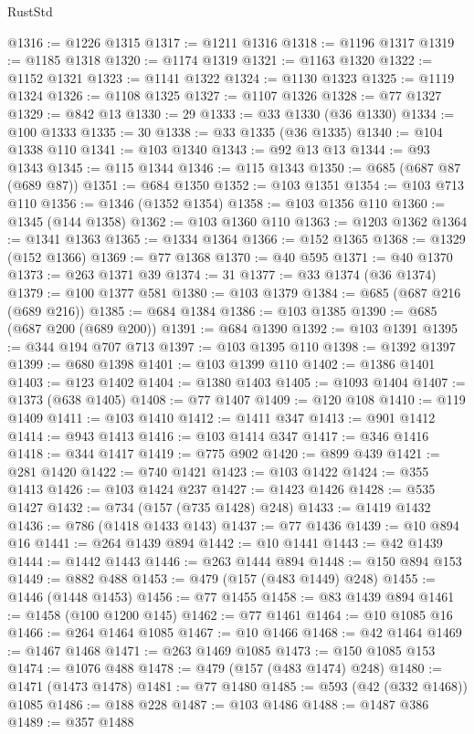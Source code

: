 \begin{lexlean}{RustStd}
\begin{coremodule}
@1316 := @1226 @1315
@1317 := @1211 @1316
@1318 := @1196 @1317
@1319 := @1185 @1318
@1320 := @1174 @1319
@1321 := @1163 @1320
@1322 := @1152 @1321
@1323 := @1141 @1322
@1324 := @1130 @1323
@1325 := @1119 @1324
@1326 := @1108 @1325
@1327 := @1107 @1326
@1328 := @77 @1327
@1329 := @842 @13
@1330 := 29
@1333 := @33 @1330 (@36 @1330)
@1334 := @100 @1333
@1335 := 30
@1338 := @33 @1335 (@36 @1335)
@1340 := @104 @1338 @110
@1341 := @103 @1340
@1343 := @92 @13 @13
@1344 := @93 @1343
@1345 := @115 @1344
@1346 := @115 @1343
@1350 := @685 (@687 @87 (@689 @87))
@1351 := @684 @1350
@1352 := @103 @1351
@1354 := @103 @713 @110
@1356 := @1346 (@1352 @1354)
@1358 := @103 @1356 @110
@1360 := @1345 (@144 @1358)
@1362 := @103 @1360 @110
@1363 := @1203 @1362
@1364 := @1341 @1363
@1365 := @1334 @1364
@1366 := @152 @1365
@1368 := @1329 (@152 @1366)
@1369 := @77 @1368
@1370 := @40 @595
@1371 := @40 @1370
@1373 := @263 @1371 @39
@1374 := 31
@1377 := @33 @1374 (@36 @1374)
@1379 := @100 @1377 @581
@1380 := @103 @1379
@1384 := @685 (@687 @216 (@689 @216))
@1385 := @684 @1384
@1386 := @103 @1385
@1390 := @685 (@687 @200 (@689 @200))
@1391 := @684 @1390
@1392 := @103 @1391
@1395 := @344 @194 @707 @713
@1397 := @103 @1395 @110
@1398 := @1392 @1397
@1399 := @680 @1398
@1401 := @103 @1399 @110
@1402 := @1386 @1401
@1403 := @123 @1402
@1404 := @1380 @1403
@1405 := @1093 @1404
@1407 := @1373 (@638 @1405)
@1408 := @77 @1407
@1409 := @120 @108
@1410 := @119 @1409
@1411 := @103 @1410
@1412 := @1411 @347
@1413 := @901 @1412
@1414 := @943 @1413
@1416 := @103 @1414 @347
@1417 := @346 @1416
@1418 := @344 @1417
@1419 := @775 @902
@1420 := @899 @439
@1421 := @281 @1420
@1422 := @740 @1421
@1423 := @103 @1422
@1424 := @355 @1413
@1426 := @103 @1424 @237
@1427 := @1423 @1426
@1428 := @535 @1427
@1432 := @734 (@157 (@735 @1428) @248)
@1433 := @1419 @1432
@1436 := @786 (@1418 @1433 @143)
@1437 := @77 @1436
@1439 := @10 @894 @16
@1441 := @264 @1439 @894
@1442 := @10 @1441
@1443 := @42 @1439
@1444 := @1442 @1443
@1446 := @263 @1444 @894
@1448 := @150 @894 @153
@1449 := @882 @488
@1453 := @479 (@157 (@483 @1449) @248)
@1455 := @1446 (@1448 @1453)
@1456 := @77 @1455
@1458 := @83 @1439 @894
@1461 := @1458 (@100 @1200 @145)
@1462 := @77 @1461
@1464 := @10 @1085 @16
@1466 := @264 @1464 @1085
@1467 := @10 @1466
@1468 := @42 @1464
@1469 := @1467 @1468
@1471 := @263 @1469 @1085
@1473 := @150 @1085 @153
@1474 := @1076 @488
@1478 := @479 (@157 (@483 @1474) @248)
@1480 := @1471 (@1473 @1478)
@1481 := @77 @1480
@1485 := @593 (@42 (@332 @1468)) @1085
@1486 := @188 @228
@1487 := @103 @1486
@1488 := @1487 @386
@1489 := @357 @1488

\end{coremodule}
\end{lexlean}
